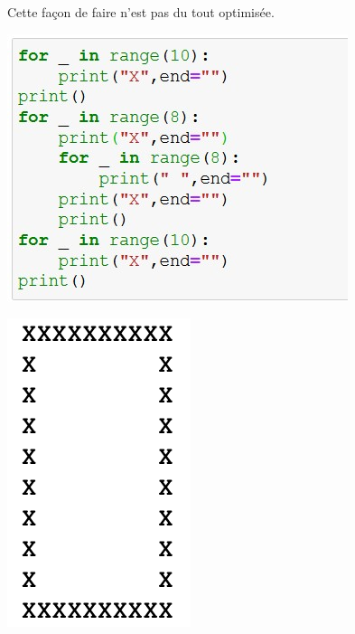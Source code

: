 \documentclass[11pt,a4paper]{article}
\begin{document}
Cette façon de faire n'est pas du tout optimisée.
\begin{center}
\begin{minipage}{8cm}
\includegraphics[scale=0.6]{img/bouclescarreXvide.jpg}
\end{minipage}
\begin{minipage}{4cm}
\includegraphics[scale=0.6]{img/carreX2.png}
\end{minipage}
\end{center}
\end{document}

